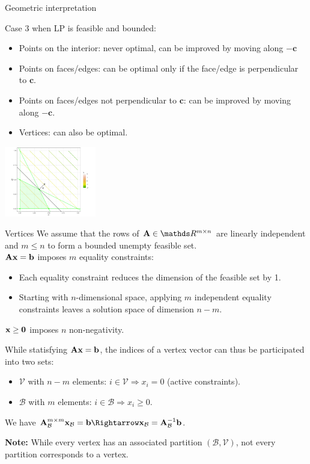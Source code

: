 \documentclass[11pt,compress,t,notes=noshow, xcolor=table]{beamer}
\begin{document}
\begin{vbframe}{Geometric interpretation}
\framebreak

Case 3 when LP is feasible and bounded:
\begin{itemize}
\item Points on the interior: never optimal, can be improved by moving along $-\mathbf{c}$
\item Points on faces/edges: can be optimal only if the face/edge is perpendicular to $\mathbf{c}$. 
\item Points on faces/edges not perpendicular to $\mathbf{c}$: can be improved by moving along $-\mathbf{c}$.
\item Vertices: can also be optimal.
\end{itemize}

\begin{center}
    \includegraphics[width=0.3\textwidth]{figure_man/cons-opposite-direction.png}
\end{center}

\end{vbframe}

\begin{vbframe}{Vertices}
We assume that the rows of $\Amat \in \R^{m \times n}$ are linearly independent and $m \le n$ to form a bounded unempty feasible set.\\
\lz
$\mathbf{A}\mathbf{x} = \mathbf{b}$ imposes $m$ equality constraints:
\begin{itemize}
    \item Each equality constraint reduces the dimension of the feasible set by 1.
    \item Starting with $n$-dimensional space, applying $m$ independent equality constraints leaves a solution space of dimension $n-m$.
\end{itemize}
\lz
$\mathbf{x} \ge \mathbf{0}$ imposes $n$ non-negativity.\\

\framebreak

While statisfying $\mathbf{A}\mathbf{x} = \mathbf{b}$, the indices of a vertex vector can thus be participated into two sets:
\begin{itemize}
    \item $\mathcal{V}$ with $n-m$ elements: $i \in \mathcal{V} \Rightarrow x_i = 0$ (active constraints).
    \item $\mathcal{B}$ with $m$ elements: $i \in \mathcal{B} \Rightarrow x_i \ge 0$.
\end{itemize}

\lz

We have $\Amat_{\mathcal{B}}^{m\times m}\xv_{\mathcal{B}} = \mathbf{b} \Rightarrow \xv_{\mathcal{B}} = \Amat_{\mathcal{B}}^{-1}\mathbf{b}$.

\lz
\lz

\textbf{Note:} While every vertex has an associated partition $(\mathcal{B}, \mathcal{V})$, not every partition corresponds to a vertex.
\end{vbframe}
\end{document}
